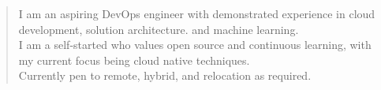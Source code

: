 \documentclass[10pt,a4paper,ragged2e,withhyper]{altacv}
\begin{document}

    
    \makecvheader
    \begin{quote}
      I am an aspiring DevOps engineer with demonstrated experience in cloud development, solution architecture. and machine learning.\\

      I am a self-started who values open source and continuous learning, with my current focus being cloud native techniques.\\

      Currently pen to remote, hybrid, and relocation as required.
    \end{quote}
    
\end{document}
